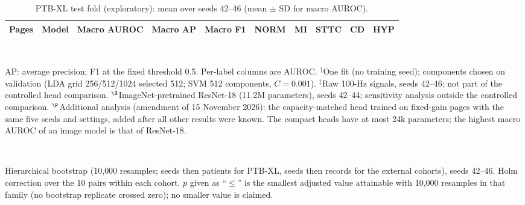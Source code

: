 \documentclass{wlscirep}
\begin{document}
\begin{table}[!t]
\centering
\caption{PTB-XL test fold (exploratory): mean over seeds 42--46 (mean $\pm$ SD for macro AUROC).}
\label{tab:ptbxl}
\footnotesize
\begin{tabular}{llcccccccc}
\toprule
Pages & Model & Macro AUROC & Macro AP & Macro F1 & NORM & MI & STTC & CD & HYP \\
\midrule

\bottomrule
\end{tabular}\\[2pt]
\begin{minipage}{0.95\textwidth}\scriptsize
AP: average precision; F1 at the fixed threshold 0.5. Per-label columns are AUROC. $^\dagger$One fit (no training seed); components chosen on validation (LDA grid 256/512/1024 selected 512; SVM 512 components, $C=0.001$). $^\ddagger$Raw 100-Hz signals, seeds 42--46; not part of the controlled head comparison. $^\S$ImageNet-pretrained ResNet-18 (11.2M parameters), seeds 42--44; sensitivity analysis outside the controlled comparison. $^\P$Additional analysis (amendment of 15 November 2026): the capacity-matched head trained on fixed-gain pages with the same five seeds and settings, added after all other results were known. The compact heads have at most 24k parameters; the highest macro AUROC of an image model is that of ResNet-18.
\end{minipage}
\end{table}

\begin{table}[!t]
\centering
\caption{Pairwise head comparisons: difference in mean-over-seeds macro AUROC [95\% CI] and Holm-adjusted $p$ (adaptive-gain pages).}
\label{tab:pairs}
\\[2pt]
\begin{minipage}{0.95\textwidth}\scriptsize
Hierarchical bootstrap (10{,}000 resamples; seeds then patients for PTB-XL, seeds then records for the external cohorts), seeds 42--46. Holm correction over the 10 pairs within each cohort. $p$ given as ``$\le$'' is the smallest adjusted value attainable with 10{,}000 resamples in that family (no bootstrap replicate crossed zero); no smaller value is claimed.
\end{minipage}
\end{table}
\end{document}
